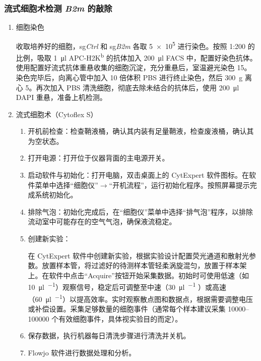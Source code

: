 \subsubsection{流式细胞术检测 \textit{B2m} 的敲除}
\begin{enumerate}
    \item 细胞染色

    收取培养好的细胞，sg\textit{Ctrl} 和 sg\textit{B2m} 各取 \qty{5e5}{} 进行染色。按照 1:200 的比例，吸取 \qty{1}{\ul} APC-H2K\textsuperscript{b} 的抗体加入 \qty{200}{\ul} FACS 中，配置好染色抗体。使用配置好流式抗体重悬收集的细胞沉淀，充分重悬后，室温避光染色 \qty{15}{\min}。染色完毕后，向离心管中加入 10 倍体积 PBS 进行终止染色，然后 \qty{300}{g} 离心 \qty{5}{\min}。再次加入 PBS 清洗细胞，彻底去除未结合的抗体后，使用 \qty{200}{\ul} DAPI 重悬，准备上机检测。
    \item 流式细胞术（Cytoflex S）
    \begin{enumerate}[label=2.\arabic*, leftmargin=*]
        \item 开机前检查：检查鞘液桶，确认其内装有足量鞘液，检查废液桶，确认其为空状态。
        \item 打开电源：打开位于仪器背面的主电源开关。
        \item 启动软件与初始化：打开电脑，双击桌面上的 CytExpert 软件图标。在软件菜单中选择``细胞仪''\(\rightarrow\)``开机流程''，运行初始化程序。按照屏幕提示完成系统初始化。
        \item 排除气泡：初始化完成后，在``细胞仪''菜单中选择``排气泡''程序，以排除流动室中可能存在的空气气泡，确保液流稳定。
        \item 创建新实验：

        在 CytExpert 软件中创建新实验，根据实验设计配置荧光通道和散射光参数。放置样本管，将过滤好的待测样本管轻柔涡旋混匀，放置于样本架上。在软件中点击``Acquire''按钮开始采集数据。初始时可使用低速（如 \qty{10}{\ul\per\min}）观察信号，稳定后可调整至中速（\qty{30}{\ul\per\min} ）或高速（\qty{60}{\ul\per\min}）以提高效率。实时观察散点图和数据点，根据需要调整电压或补偿设置。采集足够数量的细胞事件（通常每个样本建议采集 \qtyrange{10000}{100000}{} 个有效细胞事件，具体视实验目的而定）。
        \item 保存数据，执行机器每日清洗步骤进行清洗并关机。
        \item Flowjo 软件进行数据处理和分析。
    \end{enumerate}
\end{enumerate}